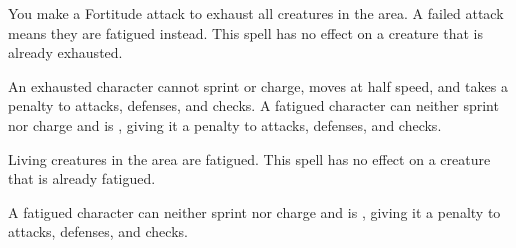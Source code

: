 \spelldur{\durshort}
\begin{spelleffect}
    You make a Fortitude attack to exhaust all creatures in the area. A failed attack means they are fatigued instead. This spell has no effect on a creature that is already exhausted.
\end{spelleffect}
\begin{spellnotes}
    An exhausted character cannot sprint or charge, moves at half speed, and takes a  penalty to attacks, defenses, and checks. A fatigued character can neither sprint nor charge and is \vulnerable, giving it a  penalty to attacks, defenses, and checks.
\end{spellnotes}

\spelldur{\durshort}
\begin{spelleffect}
  Living creatures in the area are fatigued. This spell has no effect on a creature that is already fatigued.
\end{spelleffect}
\begin{spellnotes}
    A fatigued character can neither sprint nor charge and is \vulnerable, giving it a  penalty to attacks, defenses, and checks.
\end{spellnotes}

